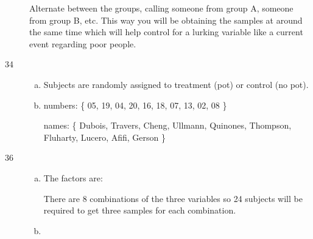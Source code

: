 \documentclass[letterpaper, landscape]{exam}
\begin{document}
\begin{description}
        Alternate between the groups, calling someone from group A, someone from
        group B, etc. This way you will be obtaining the samples at around the
        same time which will help control for a lurking variable like a current
        event regarding poor people.
        
      \item[34]
        \begin{enumerate}[(a)]
          \item Subjects are randomly assigned to treatment (pot) or control (no
            pot).

          \item numbers: \{ 05, 19, 04, 20, 16, 18, 07, 13, 02, 08 \}

            names: \{ Dubois, Travers, Cheng, Ullmann, Quinones, Thompson, Fluharty,
            Lucero, Afifi, Gerson \}

        \end{enumerate}

      \item[36]
        \begin{enumerate}[(a)]
          \item The factors are:

           There are 8 combinations of the three variables so 24 subjects
           will be required to get three samples for each combination.

          \item 
        \end{enumerate}


\end{description}
\end{document}
